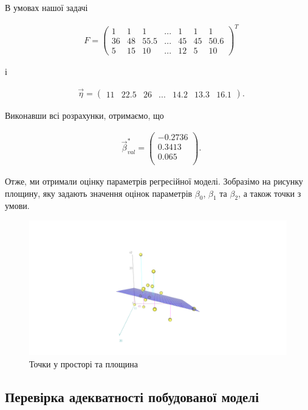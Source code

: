 \documentclass[14pt,a4paper]{scrartcl}
\theoremstyle{definition}
\theoremstyle{remark}
\theoremstyle{definition}
\theoremstyle{definition}
\begin{document}
В умовах нашої задачі

\begin{align*}
  & F = \begin{pmatrix}
    1 & 1 & 1 & ... & 1 & 1 & 1 \\
    36 & 48 & 55.5 & ... & 45 & 45 & 50.6 \\
    5 & 15 & 10 & ... & 12 & 5 & 10
  \end{pmatrix}^{T}
\end{align*}

і

\begin{align*}
  & \vec{\eta} =\begin{pmatrix}
    11 & 22.5 & 26 & ... & 14.2 & 13.3 & 16.1
  \end{pmatrix}.
\end{align*}

Виконавши всі розрахунки, отримаємо, що

\begin{align*}
  & \vec{\beta}^{*}_ {val} = \begin{pmatrix}
    -0.2736  \\
    0.3413  \\
    0.065 \\
  \end{pmatrix}.
\end{align*}

Отже, ми отримали оцінку параметрів регресійної моделі. Зобразімо на рисунку площину, яку задають значення оцінок параметрів $\beta_{0}$, $\beta_{1}$ та $\beta_{2}$, а також точки з умови.

\begin{figure}[H]
  \includegraphics[width=\linewidth]{Plot3d.png}
  \caption{Точки у просторі та площина}
  \label{fig:image4}
\end{figure}

\subsection{Перевірка адекватності побудованої моделі}
\end{document}
